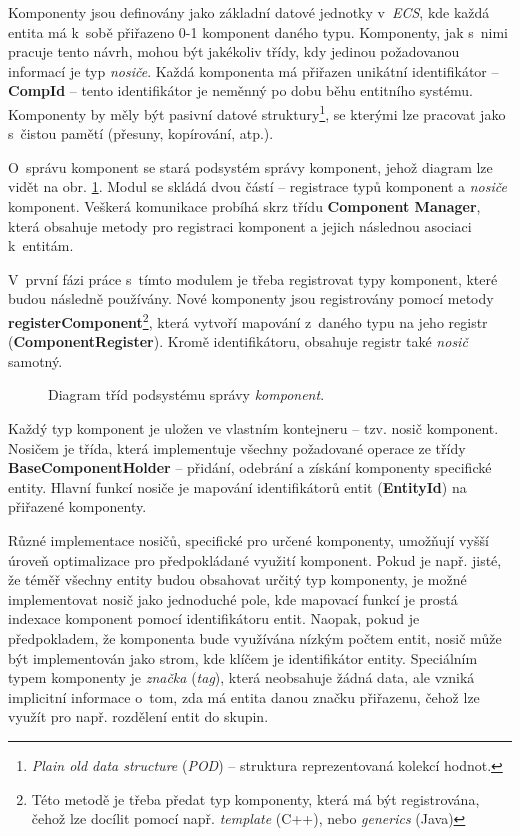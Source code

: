 Komponenty jsou definovány jako základní datové jednotky v~\emph{ECS}, kde každá entita má k~sobě přiřazeno 0-1 komponent daného typu. Komponenty, jak s~nimi pracuje tento návrh, mohou být jakékoliv třídy, kdy jedinou požadovanou informací je typ \emph{nosiče}. Každá komponenta má přiřazen unikátní identifikátor -- \textbf{CompId} -- tento identifikátor je neměnný po dobu běhu entitního systému. Komponenty by měly být pasivní datové struktury\footnote{\emph{Plain old data structure} (\emph{POD}) -- struktura reprezentovaná kolekcí hodnot.}, se kterými lze pracovat jako s~čistou pamětí (přesuny, kopírování, atp.).

O~správu komponent se stará podsystém správy komponent, jehož diagram lze vidět na obr. \ref{Fig:DESCompDiag}. Modul se skládá dvou částí -- registrace typů komponent a \emph{nosiče} komponent. Veškerá komunikace probíhá skrz třídu \textbf{Component Manager}, která obsahuje metody pro registraci komponent a jejich následnou asociaci k~entitám. 

V~první fázi práce s~tímto modulem je třeba registrovat typy komponent, které budou následně používány. Nové komponenty jsou registrovány pomocí metody \textbf{registerComponent}\footnote{Této metodě je třeba předat typ komponenty, která má být registrována, čehož lze docílit pomocí např. \emph{template} (C++), nebo \emph{generics} (Java)}, která vytvoří mapování z~daného typu na jeho registr (\textbf{ComponentRegister}). Kromě identifikátoru, obsahuje registr také \emph{nosič} samotný.

\begin{figure}[H]
	\centering
	\caption{Diagram tříd podsystému správy \emph{komponent}.}
	\label{Fig:DESCompDiag}
\end{figure}

Každý typ komponent je uložen ve vlastním kontejneru -- tzv. nosič komponent. Nosičem je třída, která implementuje všechny požadované operace ze třídy \textbf{BaseComponentHolder} -- přidání, odebrání a získání komponenty specifické entity. Hlavní funkcí nosiče je mapování identifikátorů entit (\textbf{EntityId}) na přiřazené komponenty. 

Různé implementace nosičů, specifické pro určené komponenty, umožňují vyšší úroveň optimalizace pro předpokládané využití komponent. Pokud je např. jisté, že téměř všechny entity budou obsahovat určitý typ komponenty, je možné implementovat nosič jako jednoduché pole, kde mapovací funkcí je prostá indexace komponent pomocí identifikátoru entit. Naopak, pokud je předpokladem, že komponenta bude využívána nízkým počtem entit, nosič může být implementován jako strom, kde klíčem je identifikátor entity. Speciálním typem komponenty je \emph{značka} (\emph{tag}), která neobsahuje žádná data, ale vzniká implicitní informace o~tom, zda má entita danou značku přiřazenu, čehož lze využít pro např. rozdělení entit do skupin.


